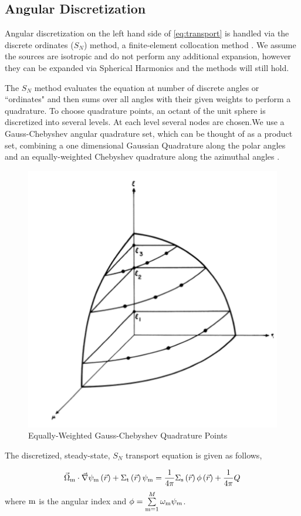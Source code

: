 \subsection{Angular Discretization}

Angular discretization on the left hand side of \eqref{eq:transport} is handled via the discrete ordinates ($S_N$) method, a finite-element collocation method \cite{Lathrop1965}. We assume the sources are isotropic and do not perform any additional expansion, however they can be expanded via Spherical Harmonics and the methods will still hold. 

The $S_N$ method evaluates the equation at number of discrete angles or ``ordinates" and then sums over all angles with their given weights to perform a quadrature. To choose quadrature points, an octant of the unit sphere is discretized into several levels. At each level several nodes are chosen.We use a Gauss-Chebyshev angular quadrature set, which can be thought of as a product set, combining a one dimensional Gaussian Quadrature along the polar angles and an equally-weighted Chebyshev quadrature along the azimuthal angles \cite{jarrel-thesis}.

\begin{figure}[H]
    \centering
    \includegraphics[width=.5\textwidth]{fig/SNPoints.png}
    \caption{Equally-Weighted Gauss-Chebyshev Quadrature Points \cite{Lathrop1965}}
    \label{fig:SN}
\end{figure}


The discretized, steady-state, $S_N$ transport equation is given as follows,

 \begin{equation}
  \vec{\Omega}_{\mathrm{m}} \cdot \vec{\nabla} \psi_{\mathrm{m}} \left(\vec{r}\right)+ \Sigma_{\mathrm{t}}\left(\vec{r}\right)\psi_{\mathrm{m}} = \frac{1}{4 \pi} \Sigma_{\mathrm{s}}\left(\vec{r}\right) \phi\left(\vec{r}\right) + \frac{1}{4 \pi} Q
  \label{eq:transport-angular}
 \end{equation}
where $\mathrm{m}$ is the angular index and $\phi = \sum\limits_{\mathrm{m}=1}^M \omega_{\mathrm{m}} \psi_m$.

